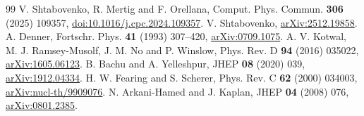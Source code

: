 \documentclass[11pt,a4paper]{article}
\begin{document}
\begin{thebibliography}{99}
V. Shtabovenko, R. Mertig and F. Orellana,
Comput. Phys. Commun. \textbf{306} (2025) 109357,
\href{https://doi.org/10.1016/j.cpc.2024.109357}{doi:10.1016/j.cpc.2024.109357}.
 V. Shtabovenko,
\href{https://arxiv.org/abs/2512.19858}{arXiv:2512.19858}.
 A. Denner, Fortschr. Phys. \textbf{41} (1993) 307--420,
\href{https://arxiv.org/abs/0709.1075}{arXiv:0709.1075}.
 A. V. Kotwal, M. J. Ramsey-Musolf, J. M. No and P. Winslow,
Phys. Rev. D \textbf{94} (2016) 035022,
\href{https://arxiv.org/abs/1605.06123}{arXiv:1605.06123}.
 B. Bachu and A. Yelleshpur, JHEP \textbf{08} (2020) 039,
\href{https://arxiv.org/abs/1912.04334}{arXiv:1912.04334}.
 H. W. Fearing and S. Scherer,
Phys. Rev. C \textbf{62} (2000) 034003,
\href{https://arxiv.org/abs/nucl-th/9909076}{arXiv:nucl-th/9909076}.
 N. Arkani-Hamed and J. Kaplan, JHEP \textbf{04} (2008) 076,
\href{https://arxiv.org/abs/0801.2385}{arXiv:0801.2385}.
\end{thebibliography}
\endgroup
\end{document}
